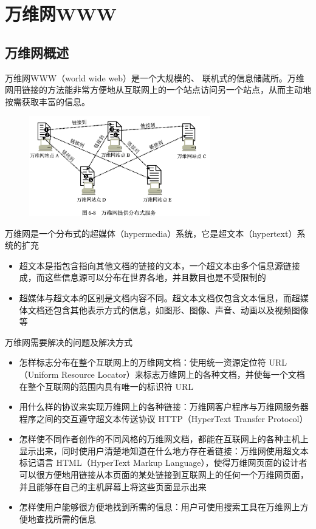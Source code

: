 \documentclass[cs4size,a4paper,10pt]{ctexart}
\begin{document}
	\section{万维网WWW}

	\subsection{万维网概述}

	万维网WWW（world wide web）是一个大规模的、 联机式的信息储藏所。万维网用链接的方法能非常方便地从互联网上的一个站点访问另一个站点，从而主动地按需获取丰富的信息。

	\begin{figure}[H]
		\centering
		\includegraphics[width=0.7\textwidth]{img/6.8}
	\end{figure}

	万维网是一个分布式的超媒体（hypermedia）系统，它是超文本（hypertext）系统的扩充
	\begin{itemize}
		\item 超文本是指包含指向其他文档的链接的文本，一个超文本由多个信息源链接成，而这些信息源可以分布在世界各地，并且数目也是不受限制的
		\item 超媒体与超文本的区别是文档内容不同。超文本文档仅包含文本信息，而超媒体文档还包含其他表示方式的信息，如图形、图像、声音、动画以及视频图像等
	\end{itemize}

	万维网需要解决的问题及解决方式
	\begin{itemize}
		\item 怎样标志分布在整个互联网上的万维网文档：使用统一资源定位符 URL（Uniform Resource Locator）来标志万维网上的各种文档，并使每一个文档在整个互联网的范围内具有唯一的标识符 URL
		\item 用什么样的协议来实现万维网上的各种链接：万维网客户程序与万维网服务器程序之间的交互遵守超文本传送协议 HTTP（HyperText Transfer Protocol）
		\item 怎样使不同作者创作的不同风格的万维网文档，都能在互联网上的各种主机上显示出来，同时使用户清楚地知道在什么地方存在着链接：万维网使用超文本标记语言 HTML（HyperText Markup Language），使得万维网页面的设计者可以很方便地用链接从本页面的某处链接到互联网上的任何一个万维网页面，并且能够在自己的主机屏幕上将这些页面显示出来
		\item 怎样使用户能够很方便地找到所需的信息：用户可使用搜索工具在万维网上方便地查找所需的信息
	\end{itemize}
\end{document}
